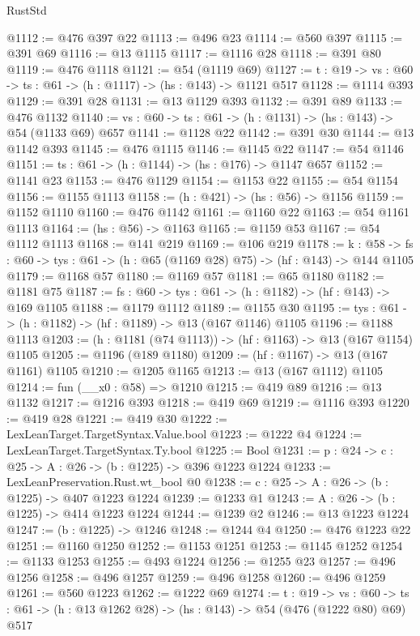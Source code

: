 \begin{lexlean}{RustStd}
\begin{coremodule}
@1112 := @476 @397 @22
@1113 := @496 @23
@1114 := @560 @397
@1115 := @391 @69
@1116 := @13 @1115
@1117 := @1116 @28
@1118 := @391 @80
@1119 := @476 @1118
@1121 := @54 (@1119 @69)
@1127 := {t : @19} -> {vs : @60} -> {ts : @61} -> (h : @1117) -> (hs : @143) -> @1121 @517
@1128 := @1114 @393
@1129 := @391 @28
@1131 := @13 @1129 @393
@1132 := @391 @89
@1133 := @476 @1132
@1140 := {vs : @60} -> {ts : @61} -> (h : @1131) -> (hs : @143) -> @54 (@1133 @69) @657
@1141 := @1128 @22
@1142 := @391 @30
@1144 := @13 @1142 @393
@1145 := @476 @1115
@1146 := @1145 @22
@1147 := @54 @1146
@1151 := {ts : @61} -> (h : @1144) -> (hs : @176) -> @1147 @657
@1152 := @1141 @23
@1153 := @476 @1129
@1154 := @1153 @22
@1155 := @54 @1154
@1156 := @1155 @1113
@1158 := (h : @421) -> (hs : @56) -> @1156
@1159 := @1152 @1110
@1160 := @476 @1142
@1161 := @1160 @22
@1163 := @54 @1161 @1113
@1164 := (hs : @56) -> @1163
@1165 := @1159 @53
@1167 := @54 @1112 @1113
@1168 := @141 @219
@1169 := @106 @219
@1178 := {k : @58} ->
  {fs : @60} -> {tys : @61} -> (h : @65 (@1169 @28) @75) -> (hf : @143) -> @144 @1105
@1179 := @1168 @57
@1180 := @1169 @57
@1181 := @65 @1180
@1182 := @1181 @75
@1187 := {fs : @60} -> {tys : @61} -> (h : @1182) -> (hf : @143) -> @169 @1105
@1188 := @1179 @1112
@1189 := @1155 @30
@1195 := {tys : @61} -> (h : @1182) -> (hf : @1189) -> @13 (@167 @1146) @1105
@1196 := @1188 @1113
@1203 := (h : @1181 (@74 @1113)) -> (hf : @1163) -> @13 (@167 @1154) @1105
@1205 := @1196 (@189 @1180)
@1209 := (hf : @1167) -> @13 (@167 @1161) @1105
@1210 := @1205 @1165
@1213 := @13 (@167 @1112) @1105
@1214 := fun (__x0 : @58) => @1210
@1215 := @419 @89
@1216 := @13 @1132
@1217 := @1216 @393
@1218 := @419 @69
@1219 := @1116 @393
@1220 := @419 @28
@1221 := @419 @30
@1222 := LexLeanTarget.TargetSyntax.Value.bool
@1223 := @1222 @4
@1224 := LexLeanTarget.TargetSyntax.Ty.bool
@1225 := Bool
@1231 := {p : @24} -> {c : @25} -> {A : @26} -> (b : @1225) -> @396 @1223 @1224
@1233 := LexLeanPreservation.Rust.wt_bool @0
@1238 := {c : @25} -> {A : @26} -> (b : @1225) -> @407 @1223 @1224
@1239 := @1233 @1
@1243 := {A : @26} -> (b : @1225) -> @414 @1223 @1224
@1244 := @1239 @2
@1246 := @13 @1223 @1224
@1247 := (b : @1225) -> @1246
@1248 := @1244 @4
@1250 := @476 @1223 @22
@1251 := @1160 @1250
@1252 := @1153 @1251
@1253 := @1145 @1252
@1254 := @1133 @1253
@1255 := @493 @1224
@1256 := @1255 @23
@1257 := @496 @1256
@1258 := @496 @1257
@1259 := @496 @1258
@1260 := @496 @1259
@1261 := @560 @1223
@1262 := @1222 @69
@1274 := {t : @19} ->
  {vs : @60} -> {ts : @61} -> (h : @13 @1262 @28) -> (hs : @143) -> @54 (@476 (@1222 @80) @69) @517

\end{coremodule}
\end{lexlean}

